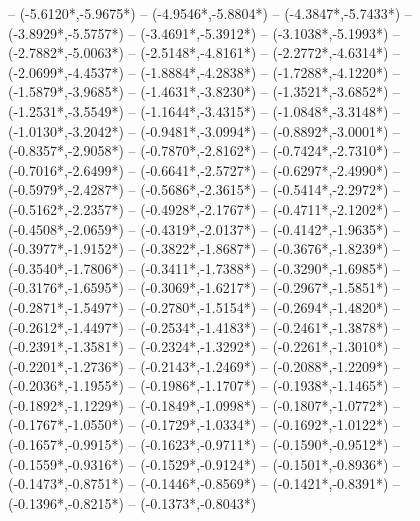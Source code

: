 {	-- ({-5.6120*\dx},{-5.9675*\dy})
	-- ({-4.9546*\dx},{-5.8804*\dy})
	-- ({-4.3847*\dx},{-5.7433*\dy})
	-- ({-3.8929*\dx},{-5.5757*\dy})
	-- ({-3.4691*\dx},{-5.3912*\dy})
	-- ({-3.1038*\dx},{-5.1993*\dy})
	-- ({-2.7882*\dx},{-5.0063*\dy})
	-- ({-2.5148*\dx},{-4.8161*\dy})
	-- ({-2.2772*\dx},{-4.6314*\dy})
	-- ({-2.0699*\dx},{-4.4537*\dy})
	-- ({-1.8884*\dx},{-4.2838*\dy})
	-- ({-1.7288*\dx},{-4.1220*\dy})
	-- ({-1.5879*\dx},{-3.9685*\dy})
	-- ({-1.4631*\dx},{-3.8230*\dy})
	-- ({-1.3521*\dx},{-3.6852*\dy})
	-- ({-1.2531*\dx},{-3.5549*\dy})
	-- ({-1.1644*\dx},{-3.4315*\dy})
	-- ({-1.0848*\dx},{-3.3148*\dy})
	-- ({-1.0130*\dx},{-3.2042*\dy})
	-- ({-0.9481*\dx},{-3.0994*\dy})
	-- ({-0.8892*\dx},{-3.0001*\dy})
	-- ({-0.8357*\dx},{-2.9058*\dy})
	-- ({-0.7870*\dx},{-2.8162*\dy})
	-- ({-0.7424*\dx},{-2.7310*\dy})
	-- ({-0.7016*\dx},{-2.6499*\dy})
	-- ({-0.6641*\dx},{-2.5727*\dy})
	-- ({-0.6297*\dx},{-2.4990*\dy})
	-- ({-0.5979*\dx},{-2.4287*\dy})
	-- ({-0.5686*\dx},{-2.3615*\dy})
	-- ({-0.5414*\dx},{-2.2972*\dy})
	-- ({-0.5162*\dx},{-2.2357*\dy})
	-- ({-0.4928*\dx},{-2.1767*\dy})
	-- ({-0.4711*\dx},{-2.1202*\dy})
	-- ({-0.4508*\dx},{-2.0659*\dy})
	-- ({-0.4319*\dx},{-2.0137*\dy})
	-- ({-0.4142*\dx},{-1.9635*\dy})
	-- ({-0.3977*\dx},{-1.9152*\dy})
	-- ({-0.3822*\dx},{-1.8687*\dy})
	-- ({-0.3676*\dx},{-1.8239*\dy})
	-- ({-0.3540*\dx},{-1.7806*\dy})
	-- ({-0.3411*\dx},{-1.7388*\dy})
	-- ({-0.3290*\dx},{-1.6985*\dy})
	-- ({-0.3176*\dx},{-1.6595*\dy})
	-- ({-0.3069*\dx},{-1.6217*\dy})
	-- ({-0.2967*\dx},{-1.5851*\dy})
	-- ({-0.2871*\dx},{-1.5497*\dy})
	-- ({-0.2780*\dx},{-1.5154*\dy})
	-- ({-0.2694*\dx},{-1.4820*\dy})
	-- ({-0.2612*\dx},{-1.4497*\dy})
	-- ({-0.2534*\dx},{-1.4183*\dy})
	-- ({-0.2461*\dx},{-1.3878*\dy})
	-- ({-0.2391*\dx},{-1.3581*\dy})
	-- ({-0.2324*\dx},{-1.3292*\dy})
	-- ({-0.2261*\dx},{-1.3010*\dy})
	-- ({-0.2201*\dx},{-1.2736*\dy})
	-- ({-0.2143*\dx},{-1.2469*\dy})
	-- ({-0.2088*\dx},{-1.2209*\dy})
	-- ({-0.2036*\dx},{-1.1955*\dy})
	-- ({-0.1986*\dx},{-1.1707*\dy})
	-- ({-0.1938*\dx},{-1.1465*\dy})
	-- ({-0.1892*\dx},{-1.1229*\dy})
	-- ({-0.1849*\dx},{-1.0998*\dy})
	-- ({-0.1807*\dx},{-1.0772*\dy})
	-- ({-0.1767*\dx},{-1.0550*\dy})
	-- ({-0.1729*\dx},{-1.0334*\dy})
	-- ({-0.1692*\dx},{-1.0122*\dy})
	-- ({-0.1657*\dx},{-0.9915*\dy})
	-- ({-0.1623*\dx},{-0.9711*\dy})
	-- ({-0.1590*\dx},{-0.9512*\dy})
	-- ({-0.1559*\dx},{-0.9316*\dy})
	-- ({-0.1529*\dx},{-0.9124*\dy})
	-- ({-0.1501*\dx},{-0.8936*\dy})
	-- ({-0.1473*\dx},{-0.8751*\dy})
	-- ({-0.1446*\dx},{-0.8569*\dy})
	-- ({-0.1421*\dx},{-0.8391*\dy})
	-- ({-0.1396*\dx},{-0.8215*\dy})
	-- ({-0.1373*\dx},{-0.8043*\dy})
}
